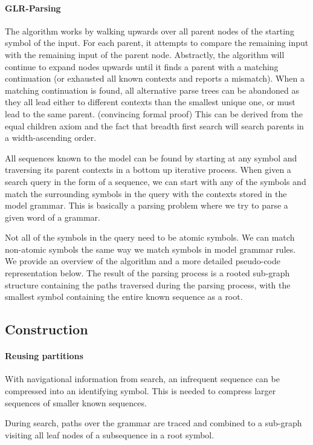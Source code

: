 \paragraph{GLR-Parsing}
The algorithm works by walking upwards over all parent nodes of the starting symbol of 
the input.
For each parent, it attempts to compare the remaining input with the remaining input of 
the parent node.
Abstractly, the algorithm will continue to expand nodes upwards until it finds a parent 
with a matching
continuation (or exhausted all known contexts and reports a mismatch).
When a matching continuation is found, all alternative parse trees can be abandoned as 
they all lead either
to different contexts than the smallest unique one, or must lead to the same parent.
(convincing formal proof)
This can be derived from the equal children axiom and the fact that breadth first search 
will search parents
in a width-ascending order.

All sequences known to the model can be found by starting at any symbol and traversing 
its parent contexts in a bottom up iterative process. When given a search query in the 
form of a sequence, we can start with any of the symbols and match the surrounding 
symbols in the query with the contexts stored in the model grammar. This is basically a 
parsing problem where we try to parse a given word of a grammar.

Not all of the symbols in the query need to be atomic symbols. We can match non-atomic symbols the same way we match symbols in model grammar rules. We provide an overview of the algorithm and a more detailed pseudo-code representation below. The result of the parsing process is a rooted sub-graph structure containing the paths traversed during the parsing process, with the smallest symbol containing the entire known sequence as a root. 

\subsection{Construction}

\paragraph{Reusing partitions}
With navigational information from search, an infrequent sequence can be compressed into an identifying symbol. This is needed to compress larger sequences of smaller known sequences.

During search, paths over the grammar are traced and combined to a sub-graph visiting all leaf nodes of a subsequence in a root symbol.

